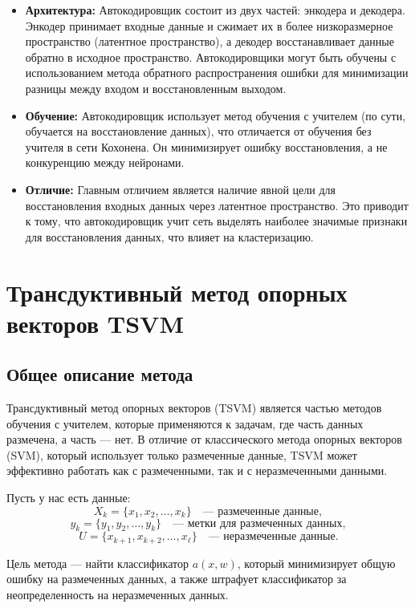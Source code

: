 \begin{itemize}
    \item \textbf{Архитектура:} Автокодировщик состоит из двух частей: энкодера и декодера. Энкодер принимает входные данные и сжимает их в более низкоразмерное пространство (латентное пространство), а декодер восстанавливает данные обратно в исходное пространство. Автокодировщики могут быть обучены с использованием метода обратного распространения ошибки для минимизации разницы между входом и восстановленным выходом.
    \item \textbf{Обучение:} Автокодировщик использует метод обучения с учителем (по сути, обучается на восстановление данных), что отличается от обучения без учителя в сети Кохонена. Он минимизирует ошибку восстановления, а не конкуренцию между нейронами.
    \item \textbf{Отличие:} Главным отличием является наличие явной цели для восстановления входных данных через латентное пространство. Это приводит к тому, что автокодировщик учит сеть выделять наиболее значимые признаки для восстановления данных, что влияет на кластеризацию.
\end{itemize}

\section*{Трансдуктивный метод опорных векторов TSVM}

\subsection{Общее описание метода}

Трансдуктивный метод опорных векторов (TSVM) является частью методов обучения с учителем, которые применяются к задачам, где часть данных размечена, а часть — нет. В отличие от классического метода опорных векторов (SVM), который использует только размеченные данные, TSVM может эффективно работать как с размеченными, так и с неразмеченными данными.

Пусть у нас есть данные:
\[
    X_k = \{x_1, x_2, \dots, x_k\} \quad \text{— размеченные данные},
\]
\[
    y_k = \{y_1, y_2, \dots, y_k\} \quad \text{— метки для размеченных данных},
\]
\[
    U = \{x_{k+1}, x_{k+2}, \dots, x_\ell\} \quad \text{— неразмеченные данные}.
\]

Цель метода — найти классификатор \( a(x, w) \), который минимизирует общую ошибку на размеченных данных, а также штрафует классификатор за неопределенность на неразмеченных данных.

